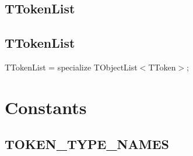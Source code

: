 \documentclass{report}
\newif\ifpdf
\begin{document}
\subsection*{\large{\textbf{TTokenList}}\normalsize\hspace{1ex}\hrulefill}
\else
\subsection*{TTokenList}
\fi
\label{PasDoc_Tokenizer-TTokenList}
\begin{list}{}{
\setlength{\itemindent}{0cm}
\setlength{\listparindent}{0cm}
\setlength{\leftmargin}{\evensidemargin}
\addtolength{\leftmargin}{\tmplength}
\settowidth{\labelsep}{X}
\addtolength{\leftmargin}{\labelsep}
\setlength{\labelwidth}{\tmplength}
}
\item[\textbf{Declaration}\hfill]
\ifpdf
\begin{flushleft}
\fi
\begin{ttfamily}
TTokenList = specialize TObjectList{$<$}TToken{$>$};\end{ttfamily}

\ifpdf
\end{flushleft}
\fi

\end{list}
\section{Constants}
\ifpdf
\subsection*{\large{\textbf{TOKEN{\_}TYPE{\_}NAMES}}\normalsize\hspace{1ex}\hrulefill}
\else
\end{document}
